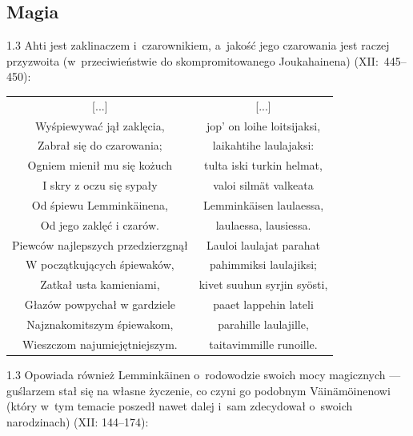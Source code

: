 \documentclass[11pt,a4paper,twoside]{report}
\begin{document}
\subsection*{Magia}
\begin{spacing}{1.3}
Ahti jest zaklinaczem i~czarownikiem, a~jakość jego czarowania jest raczej przyzwoita (w~przeciwieństwie do skompromitowanego Joukahainena) (XII:~445--450):
\end{spacing}
{\centering
\small
\begin{longtable}{c c}
{[...]} & {[...]} \\
Wyśpiewywać jął zaklęcia, & jop' on loihe loitsijaksi, \\
Zabrał się do czarowania; & laikahtihe laulajaksi: \\
Ogniem mienił mu się kożuch & tulta iski turkin helmat, \\
I skry z oczu się sypały & valoi silmät valkeata \\
Od śpiewu Lemminkäinena, & Lemminkäisen laulaessa, \\
Od jego zaklęć i czarów. & laulaessa, lausiessa. \\
Piewców najlepszych przedzierzgnął & Lauloi laulajat parahat \\
W początkujących śpiewaków, & pahimmiksi laulajiksi; \\
Zatkał usta kamieniami, & kivet suuhun syrjin syösti, \\
Głazów powpychał w gardziele & paaet lappehin lateli \\
Najznakomitszym śpiewakom, & parahille laulajille, \\
Wieszczom najumiejętniejszym. & taitavimmille runoille. \\
\end{longtable}
}
\begin{spacing}{1.3}
Opowiada również Lemminkäinen o~rodowodzie swoich mocy magicznych --- guślarzem stał się na własne życzenie, co czyni go podobnym Väinämöinenowi (który w~tym temacie poszedł nawet dalej i~sam zdecydował o~swoich narodzinach) (XII: 144--174):
\end{spacing}
\end{document}

